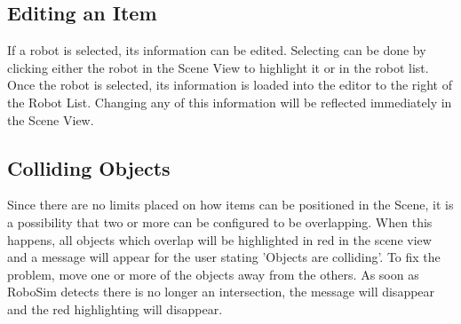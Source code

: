 \documentclass{article}
\begin{document}
\subsection{Editing an Item}
If a robot is selected, its information can be edited.  Selecting can be done
by clicking either the robot in the Scene View to highlight it or in the robot
list.  Once the robot is selected, its information is loaded into the editor to
the right of the Robot List.  Changing any of this information will be
reflected immediately in the Scene View.

\subsection{Colliding Objects}
Since there are no limits placed on how items can be positioned in the Scene,
it is a possibility that two or more can be configured to be overlapping.  When
this happens, all objects which overlap will be highlighted in red in the scene
view and a message will appear for the user stating 'Objects are colliding'.
To fix the problem, move one or more of the objects away from the others.  As
soon as RoboSim detects there is no longer an intersection, the message will
disappear and the red highlighting will disappear.

%
%
\end{document}

